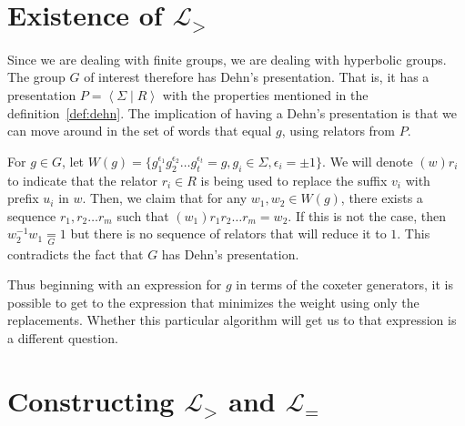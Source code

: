 \documentclass{article}
\begin{document}
\section{Existence of $\mathcal{L}_{>}$}
\label{sec:lib_existence}
Since we are dealing with finite groups, we are dealing with hyperbolic groups. The group $G$ of interest therefore has Dehn's presentation. That is, it has a presentation $P=\left< \Sigma \mid R \right>$ with the properties mentioned in the definition~\ref{def:dehn}. The implication of having a Dehn's presentation is that we can move around in the set of words that equal $g$, using relators from $P$. 

For $g \in G$, let $W(g)=\{g_1^{\epsilon_1}g_2^{\epsilon_2} \hdots g_t^{\epsilon_t}=g, g_i \in \Sigma, \epsilon_i = \pm 1\}$. We will denote $(w)r_i$ to indicate that the relator $r_i \in R$ is being used to replace the suffix $v_i$ with prefix $u_i$ in $w$. Then, we claim that for any $w_1,w_2 \in W(g)$, there exists a sequence $r_1,r_2 \hdots r_m$ such that $(w_1)r_1 r_2 \hdots r_m = w_2$. If this is not the case, then $w_2^{-1}w_1 \underset{G}{=} 1$ but there is no sequence of relators that will reduce it to $1$. This contradicts the fact that $G$ has Dehn's presentation.

Thus beginning with an expression for $g$ in terms of the coxeter generators, it is possible to get to the expression that minimizes the weight using only the replacements. Whether this particular algorithm will get us to that expression is a different question.
\section{Constructing $\mathcal{L}_{>}$ and $\mathcal{L}_{=}$}
\end{document}
